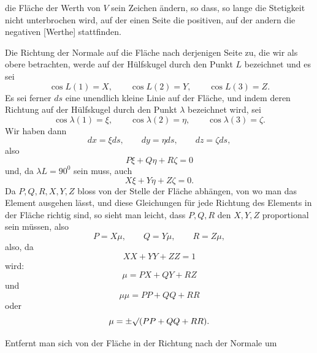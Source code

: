%
die Fläche der Werth von $V$ sein Zeichen ändern, so dass, so lange die Stetigkeit nicht unterbrochen wird, auf der einen Seite die positiven, auf der andern die negativen [Werthe] stattfinden.

Die Richtung der Normale auf die Fläche nach derjenigen Seite zu, die wir als obere betrachten, werde auf der Hülfskugel durch den Punkt $L$ bezeichnet und es sei
\[
\cos L(1)=X,\qquad\cos L(2)=Y,\qquad\cos L(3)=Z.
\]
Es sei ferner $ds$ eine unendlich kleine Linie auf der Fläche, und indem deren Richtung auf der Hülfskugel durch den Punkt $\lambda$ bezeichnet wird, sei
\[
\cos\lambda(1)=\xi,\qquad\cos\lambda(2)=\eta,\qquad\cos\lambda(3)=\zeta.
\]
Wir haben dann
\[
dx=\xi ds,\qquad dy=\eta ds,\qquad dz=\zeta ds,
\]
also
\[
P\xi+Q\eta+R\zeta=0
\]
und, da $\lambda L=90^{0}$ sein muss, auch
\[
X\xi+Y\eta+Z\zeta=0.
\]
Da $P,Q,R,X,Y,Z$ bloss von der Stelle der Fläche abhängen, von wo man das Element ausgehen lässt, und diese Gleichungen für jede Richtung des Elements in der Fläche richtig sind, so sieht man leicht, dass $P,Q,R$ den $X,Y,Z$ proportional sein müssen, also
\[
P=X\mu,\qquad Q=Y\mu,\qquad R=Z\mu,
\]
also, da
\[
XX+YY+ZZ=1
\]
wird:
\[
\mu=PX+QY+RZ
\]
und
\[
\mu\mu=PP+QQ+RR
\]
oder
\[
\mu=\pm\mathord{\surd}(PP+QQ+RR).
\]

Entfernt man sich von der Fläche in der Richtung nach der Normale um
